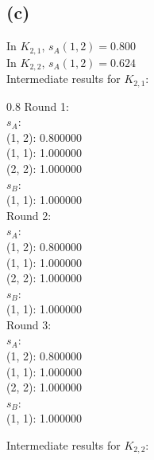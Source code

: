 \documentclass{article}
\newenvironment{myenv}[1]
  {\begin{spacing}{#1}}
  {\end{spacing}}
\begin{document}
\subsection{(c)}
In $K_{2,1}$, $s_A(1, 2) = 0.800$ \\
In $K_{2,2}$, $s_A(1, 2) = 0.624$ \\

Intermediate results for $K_{2,1}$: \\
\begin{myenv}{0.8}
Round 1:\\ 
$s_A$:\\
(1, 2): 0.800000 \\
(1, 1): 1.000000 \\
(2, 2): 1.000000 \\
$s_B$:\\
(1, 1): 1.000000 \\
Round 2:\\ 
$s_A$:\\
(1, 2): 0.800000 \\
(1, 1): 1.000000 \\
(2, 2): 1.000000 \\
$s_B$:\\
(1, 1): 1.000000 \\
Round 3:\\ 
$s_A$:\\
(1, 2): 0.800000 \\
(1, 1): 1.000000 \\
(2, 2): 1.000000 \\
$s_B$:\\
(1, 1): 1.000000 \\
\end{myenv}

Intermediate results for $K_{2,2}$: \\
\end{document}
